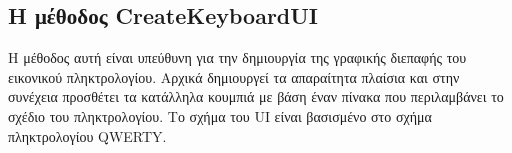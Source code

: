 \subsection{Η μέθοδος CreateKeyboardUI}

Η μέθοδος αυτή είναι υπεύθυνη για την δημιουργία της γραφικής διεπαφής του εικονικού πληκτρολογίου.
Αρχικά δημιουργεί τα απαραίτητα πλαίσια και στην συνέχεια προσθέτει τα κατάλληλα κουμπιά με βάση
έναν πίνακα που περιλαμβάνει το σχέδιο του πληκτρολογίου. Το σχήμα του UI είναι βασισμένο στο
σχήμα πληκτρολογίου QWERTY.






\begin{lstlisting}[language=C++, style=cppstyle]
\end{lstlisting}